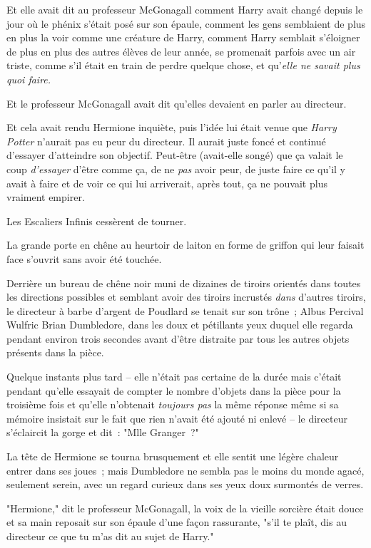 Et elle avait dit au professeur McGonagall comment Harry avait changé depuis le jour où le phénix s'était posé sur son épaule, comment les gens semblaient de plus en plus la voir comme une créature de Harry, comment Harry semblait s'éloigner de plus en plus des autres élèves de leur année, se promenait parfois avec un air triste, comme s'il était en train de perdre quelque chose, et qu'\emph{elle ne savait plus quoi faire.}

Et le professeur McGonagall avait dit qu'elles devaient en parler au directeur.

Et cela avait rendu Hermione inquiète, puis l'idée lui était venue que \emph{Harry Potter} n'aurait pas eu peur du directeur. Il aurait juste foncé et continué d'essayer d'atteindre son objectif. Peut-être (avait-elle songé) que ça valait le coup \emph{d'essayer} d'être comme ça, de ne \emph{pas} avoir peur, de juste faire ce qu'il y avait à faire et de voir ce qui lui arriverait, après tout, ça ne pouvait plus vraiment empirer.

Les Escaliers Infinis cessèrent de tourner.

La grande porte en chêne au heurtoir de laiton en forme de griffon qui leur faisait face s'ouvrit sans avoir été touchée.

Derrière un bureau de chêne noir muni de dizaines de tiroirs orientés dans toutes les directions possibles et semblant avoir des tiroirs incrustés \emph{dans} d'autres tiroirs, le directeur à barbe d'argent de Poudlard se tenait sur son trône~; Albus Percival Wulfric Brian Dumbledore, dans les doux et pétillants yeux duquel elle regarda pendant environ trois secondes avant d'être distraite par tous les autres objets présents dans la pièce.

Quelque instants plus tard -- elle n'était pas certaine de la durée mais c'était pendant qu'elle essayait de compter le nombre d'objets dans la pièce pour la troisième fois et qu'elle n'obtenait \emph{toujours pas} la même réponse même si sa mémoire insistait sur le fait que rien n'avait été ajouté ni enlevé -- le directeur s'éclaircit la gorge et dit~: "Mlle Granger~?"

La tête de Hermione se tourna brusquement et elle sentit une légère chaleur entrer dans ses joues~; mais Dumbledore ne sembla pas le moins du monde agacé, seulement serein, avec un regard curieux dans ses yeux doux surmontés de verres.

"Hermione," dit le professeur McGonagall, la voix de la vieille sorcière était douce et sa main reposait sur son épaule d'une façon rassurante, "s'il te plaît, dis au directeur ce que tu m'as dit au sujet de Harry."

